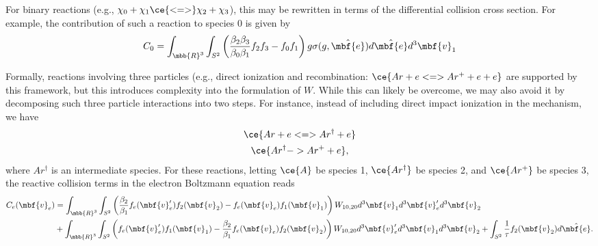 For binary reactions (e.g., $\chi_0 + \chi_1 \ce{<=>} \chi_2 +
\chi_3$), this may be rewritten in terms of the differential collision
cross section.  For example, the contribution of such a reaction to
species 0 is given by
%
\begin{equation*}
C_0 = \int_{\mbb{R}^3} \int_{S^2} \left( \frac{\beta_2 \beta_3}{\beta_0 \beta_1} f_2 f_3 - f_0 f_1\right) g \sigma(g, \hat{\mbf{e}}) d\hat{\mbf{e}} d^3 \mbf{v}_1
\end{equation*}
%

Formally, reactions involving three
particles (e.g., direct ionization and recombination: $\ce{Ar + e <=>
  Ar^+ + e + e}$ are supported by this framework, but this introduces
complexity into the formulation of $W$.  While this can likely be
overcome,
 we may also avoid it by decomposing such three particle
interactions into two steps.  For instance, instead of including
direct impact ionization in the mechanism, we have
%
\begin{gather*}
\ce{Ar + e <=> Ar^{\dagger} + e} \\
\ce{Ar^{\dagger} -> Ar^+ + e},
\end{gather*}
%
where $Ar^{\dagger}$ is an intermediate species.  For these reactions,
letting $\ce{A}$ be species 1, $\ce{Ar^{\dagger}}$ be species 2, and
$\ce{Ar^+}$ be species 3, the reactive collision terms in the electron
Boltzmann equation reads
%
\begin{align*}
C_e(\mbf{v}_e)
&=
\int_{\mbb{R}^3} \int_{S^2}
\left( \frac{\beta_2}{\beta_1} f_e(\mbf{v}^{\prime}_e) f_2(\mbf{v}_2) - f_e(\mbf{v}_e) f_1(\mbf{v}_1) \right) W_{10,20} d^3 \mbf{v}_1 d^3 \mbf{v}^{\prime}_e d^3 \mbf{v}_2
\\
&+\int_{\mbb{R}^3} \int_{S^2}
\left( f_e(\mbf{v}^{\prime}_e) f_1(\mbf{v}_1) - \frac{\beta_2}{\beta_1} f_e(\mbf{v}_e) f_2(\mbf{v}_2) \right) W_{10,20} d^3 \mbf{v}^{\prime}_e d^3 \mbf{v}_1 d^3 \mbf{v}_2
+
\int_{S^2} \frac{1}{\tau} f_2(\mbf{v}_2) d\hat{\mbf{e}}.
\end{align*}
%

